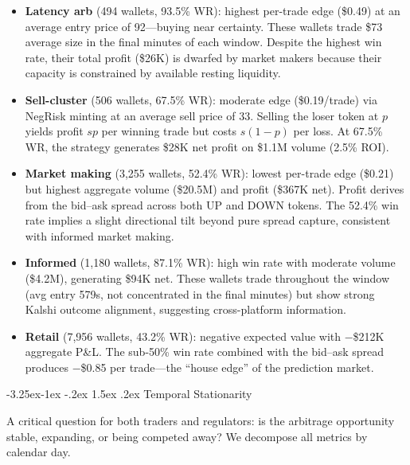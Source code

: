 \documentclass[11pt,a4paper]{article}
\makeatletter
\renewcommand\subsection{\@startsection{subsection}{2}{\z@}%
  {-3.25ex\@plus -1ex \@minus -.2ex}%
  {1.5ex \@plus .2ex}%
  {\normalfont\large\bfseries}}
\makeatother
\begin{document}
\begin{itemize}[nosep]
    \item \textbf{Latency arb} (494 wallets, 93.5\% WR): highest per-trade edge (\$0.49) at an average entry price of 92\textcent---buying near certainty. These wallets trade \$73 average size in the final minutes of each window. Despite the highest win rate, their total profit (\$26K) is dwarfed by market makers because their capacity is constrained by available resting liquidity.
    \item \textbf{Sell-cluster} (506 wallets, 67.5\% WR): moderate edge (\$0.19/trade) via NegRisk minting at an average sell price of 33\textcent. Selling the loser token at $p$ yields profit $sp$ per winning trade but costs $s(1-p)$ per loss. At 67.5\% WR, the strategy generates \$28K net profit on \$1.1M volume (2.5\% ROI).
    \item \textbf{Market making} (3,255 wallets, 52.4\% WR): lowest per-trade edge (\$0.21) but highest aggregate volume (\$20.5M) and profit (\$367K net). Profit derives from the bid--ask spread across both UP and DOWN tokens. The 52.4\% win rate implies a slight directional tilt beyond pure spread capture, consistent with informed market making.
    \item \textbf{Informed} (1,180 wallets, 87.1\% WR): high win rate with moderate volume (\$4.2M), generating \$94K net. These wallets trade throughout the window (avg entry 579s, not concentrated in the final minutes) but show strong Kalshi outcome alignment, suggesting cross-platform information.
    \item \textbf{Retail} (7,956 wallets, 43.2\% WR): negative expected value with $-$\$212K aggregate P\&L. The sub-50\% win rate combined with the bid--ask spread produces $-$\$0.85 per trade---the ``house edge'' of the prediction market.
\end{itemize}

\subsection{Temporal Stationarity}

A critical question for both traders and regulators: is the arbitrage opportunity stable, expanding, or being competed away? We decompose all metrics by calendar day.
\end{document}
